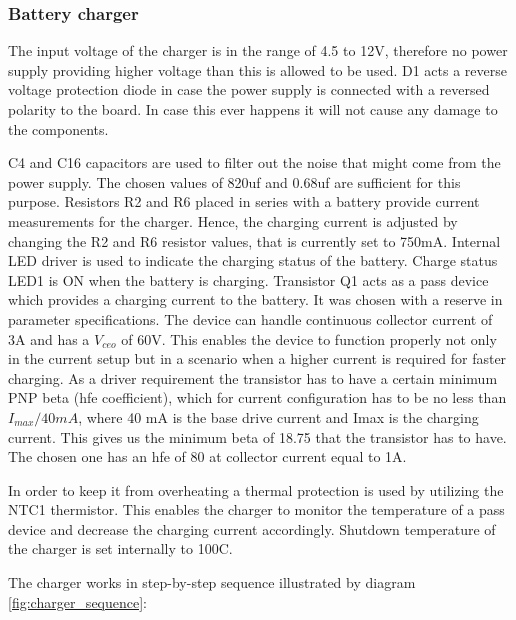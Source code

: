 \subsubsection{Battery charger}
The input voltage of the charger is in the range of 4.5 to 12V, therefore no power supply providing higher voltage than this is allowed to be used. D1 acts a reverse voltage protection diode in case the power supply is connected with a reversed polarity to the board. In case this ever happens it will not cause any damage to the components. 


C4 and C16 capacitors are used to filter out the noise that might come from the power supply. The chosen values of 820uf and 0.68uf are sufficient for this purpose. Resistors R2 and R6 placed in series with a battery provide current measurements for the charger. Hence, the charging current is adjusted by changing the R2 and R6 resistor values, that is currently set to 750mA. Internal LED driver is used to indicate the charging status of the battery. Charge status LED1 is ON when the battery is charging. Transistor Q1 acts as a pass device which provides a charging current to the battery. It was chosen with a reserve in parameter specifications. The device can handle continuous collector current of 3A and has a $V_{ceo}$ of 60V. This enables the device to function properly not only in the current setup but in a scenario when a higher current is required for faster charging. As a driver requirement the transistor has to have a certain minimum PNP beta (hfe coefficient), which for current configuration has to be no less than $I_{max} / 40mA $, where 40 mA is the base drive current and Imax is the charging current. This gives us the minimum beta of 18.75 that the transistor has to have. The chosen one has an hfe of 80 at collector current equal to 1A. 

In order to keep it from overheating a thermal protection is used by utilizing the NTC1 thermistor. This enables the charger to monitor the temperature of a pass device and decrease the charging current accordingly. Shutdown temperature of the charger is set internally to 100C. 

The charger works in step-by-step sequence illustrated by diagram \ref{fig:charger_sequence}:


